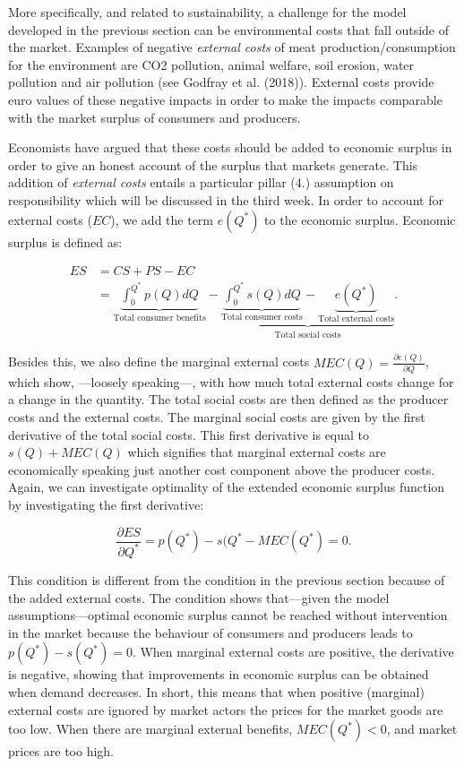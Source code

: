 \documentclass[
]{book}
\begin{document}
More specifically, and related to sustainability, a challenge for the model developed in the previous section can be environmental costs that fall outside of the market. Examples of negative \emph{external costs} of meat production/consumption for the environment are CO2 pollution, animal welfare, soil erosion, water pollution and air pollution (see Godfray et al. (2018)). External costs provide euro values of these negative impacts in order to make the impacts comparable with the market surplus of consumers and producers.

Economists have argued that these costs should be added to economic surplus in order to give an honest account of the surplus that markets generate. This addition of \emph{external costs} entails a particular pillar (4.) assumption on responsibility which will be discussed in the third week. In order to account for external costs (\(EC\)), we add the term \(e(Q^\ast)\) to the economic surplus. Economic surplus is defined as:

\begin{align}
ES &= CS + PS - EC \\
&= \underbrace{\int_0^{Q^\ast} p(Q)dQ}_\text{Total consumer benefits} - \underbrace{\underbrace{\int^{Q^\ast}_0 s(Q)dQ}_\text{Total consumer costs} - \underbrace{e(Q^\ast)}_\text{Total external costs}}_\text{Total social costs}.
\end{align}

Besides this, we also define the marginal external costs \(MEC(Q)=\frac{\partial e(Q)}{\partial Q}\), which show, ---loosely speaking---, with how much total external costs change for a change in the quantity. The total social costs are then defined as the producer costs and the external costs. The marginal social costs are given by the first derivative of the total social costs. This first derivative is equal to \(s(Q)+MEC(Q)\) which signifies that marginal external costs are economically speaking just another cost component above the producer costs. Again, we can investigate optimality of the extended economic surplus function by investigating the first derivative:

\begin{equation}
\frac{\partial ES}{\partial Q^\ast} = p(Q^\ast) - s(Q^\ast - MEC(Q^\ast) = 0.
\end{equation}

This condition is different from the condition in the previous section because of the added external costs. The condition shows that---given the model assumptions---optimal economic surplus cannot be reached without intervention in the market because the behaviour of consumers and producers leads to \(p(Q^\ast)-s(Q^\ast)=0\). When marginal external costs are positive, the derivative is negative, showing that improvements in economic surplus can be obtained when demand decreases. In short, this means that when positive (marginal) external costs are ignored by market actors the prices for the market goods are too low. When there are marginal external benefits, \(MEC(Q^\ast )<0\), and market prices are too high.
\end{document}
